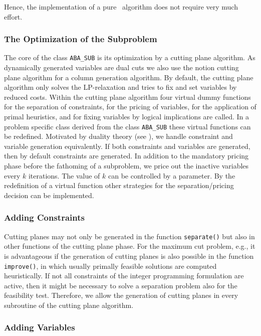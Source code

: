Hence, the implementation of a pure \bab\ algorithm does not require
very much effort.

\subsubsection{The Optimization of the Subproblem}

The core of the class {\tt ABA\_SUB} is its optimization by a cutting plane
algorithm. As dynamically generated variables are dual cuts we also
use the notion cutting plane algorithm for a column generation algorithm.
By default, the cutting plane algorithm only solves the LP-relaxation and
tries to fix and set variables by reduced costs. Within the cutting
plane algorithm four virtual dummy functions for the separation of
constraints, for the pricing of variables, for the application of primal
heuristics, and for fixing variables by logical 
implications are called. In a problem specific class derived from the
class {\tt ABA\_SUB} these virtual functions can be redefined. Motivated
by duality theory (see \cite{Thi95}), we handle constraint and variable
generation equivalently. If both constraints and variables are generated,
then by default constraints are generated. In addition to the
mandatory pricing phase before the fathoming of a subproblem, we 
price out the inactive variables every $k$ iterations. The value of
$k$ can be controlled by a parameter. By the
redefinition of a virtual function other strategies for the
separation/pricing decision can be implemented.

\subsubsection{Adding Constraints}

Cutting planes may not only be generated in the function {\tt separate()}
but also in other functions of the cutting plane phase.
For the maximum cut problem, e.g., it is advantageous if the generation of
cutting planes is also possible in the function {\tt improve()}, in
which usually primally feasible solutions are computed heuristically. 
If not all constraints of the integer programming formulation are active,
then it might be necessary to solve a separation problem also for the
feasibility test.
Therefore, we allow
the generation of cutting planes in every subroutine of the cutting
plane algorithm.

\subsubsection{Adding Variables}

